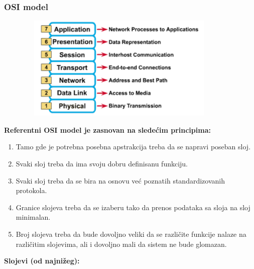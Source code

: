 \documentclass[a4paper]{article}
\begin{document}
        \subsubsection{OSI model}
            \begin{figure}[H]
                \begin{center}
                    \includegraphics[width=100mm,height=50mm]{Slike/osi_model.png}
                \end{center}
            \end{figure}
            \noindent \textbf{Referentni OSI model je zasnovan na sledećim principima:}
            \begin{enumerate}
                \item Tamo gde je potrebna posebna apstrakcija treba da se napravi poseban sloj.
                \item Svaki sloj treba da ima svoju dobru definisanu funkciju.
                \item Svaki sloj treba da se bira na osnovu već poznatih standardizovanih protokola.
                \item Granice slojeva treba da se izaberu tako da prenos podataka sa sloja na sloj 
                      minimalan.
                \item Broj slojeva treba da bude dovoljno veliki da se različite funkcije nalaze 
                      na različitim slojevima, ali i dovoljno mali da sistem ne bude glomazan.
            \end{enumerate}
            \textbf{Slojevi (od najnižeg):}
\end{document}
